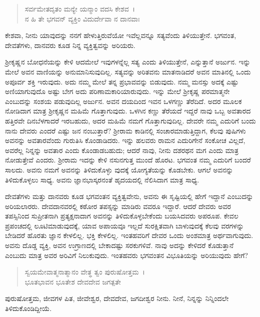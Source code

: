 \begin{verse}
ಸರ್ವಮೇತದೃತಂ ಮನ್ಯೇ ಯನ್ಮಾಂ ವದಸಿ ಕೇಶವ~।\\ನ ಹಿ ತೇ ಭಗವನ್ ವ್ಯಕ್ತಿಂ ವಿದುರ್ದೇವಾ ನ ದಾನವಾಃ 
\end{verse}

{\small ಕೇಶವಾ, ನೀನು ಯಾವುದನ್ನು ನನಗೆ ಹೇಳುತ್ತಿರುವೆಯೋ ಇವೆಲ್ಲವನ್ನೂ ಸತ್ಯವೆಂದು ತಿಳಿಯುತ್ತೇನೆ. ಭಗವಂತ, ದೇವತೆಗಳು, ದಾನವರು ಕೂಡ ನಿನ್ನ ವ್ಯಕ್ತಿತ್ವವನ್ನು ಅರಿಯರು.}

ಶ‍್ರೀಕೃಷ್ಣನ ಬೋಧನೆಯನ್ನು ಕೇಳಿ ಆದಮೇಲೆ ಇವುಗಳನ್ನೆಲ್ಲ ಸತ್ಯ ಎಂದು ತಿಳಿಯುತ್ತೇನೆ, ಎನ್ನುತ್ತಾನೆ ಅರ್ಜುನ. ಇನ್ನು ಮೇಲೆ ಅವನ ವಾಣಿಯನ್ನು ಅನುಮಾನಿಸುವುದಿಲ್ಲ. ಸತ್ಯವನ್ನು ಅರಿತವನು ಮಾತನಾಡಿದರೆ ಅವನ ಮಾತಿನಲ್ಲಿ ಒಂದು ಅಪೂರ್ವ ಶಕ್ತಿ ಇರುವುದು. ಅದು ನಮ್ಮ ಮೇಲೆ ತನ್ನ ಪ್ರಭಾವವನ್ನು ಬಿಡುವುದು. ನಮ್ಮ ಮನಸ್ಸು ಅದಕ್ಕೆ ಎಷ್ಟು ಅಣಿಯಾಗುವುದೊ ಅಷ್ಟು ಬೇಗ ಅದು ಪರಿಣಾಮಕಾರಿಯಾರುವುದು. ಇನ್ನು ಮೇಲೆ ಶ‍್ರೀಕೃಷ್ಣ ಪರಮಾತ್ಮನೇ ಎಂಬುದನ್ನು ಸಂಶಯ ಪಡುವುದಿಲ್ಲ ಅರ್ಜುನ. ಅವನ ದಯದಿಂದ ಇವನ ಒಳಗಣ್ಣು ತೆರೆದಿದೆ. ಅದರ ಮೂಲಕ ನೋಡಿದಾಗ ಮಾತ್ರ ಶ‍್ರೀಕೃಷ್ಣನ ಮಹಿಮೆ ಗೊತ್ತಾಗುವುದು. ಒಳಗಿನ ಕಣ್ಣು ತೆರೆಯದೆ ಇದ್ದರೆ ನಾವು ಒಬ್ಬ ಅವತಾರದ ಹತ್ತಿರವೇ ದಿನಬೆಳಗಾದರೆ ಇರಬಹುದು, ಅದರ ಮಹಿಮೆ ನಮಗೆ ಗೊತ್ತಾಗುವುದಿಲ್ಲ. ದೇವರೇ ನಮ್ಮ ಎದುರಿಗೆ ಬಂದು ನಾನು ದೇವರು ಎಂದರೆ ಎಷ್ಟು ಜನ ನಂಬುತ್ತಾರೆ? ಶ‍್ರೀರಾಮ ಕಾಡಿನಲ್ಲಿ ಸಂಚಾರಮಾಡುತ್ತಿದ್ದಾಗ, ಕೆಲವು ಪುಷಿಗಳು ಅವನನ್ನು ಅವತಾರವೆಂದು ಗುರುತಿಸಿ ಕೊಂಡಾಡಿದರು. ಇನ್ನು ಹಲವರು ರಾಮನ ಎದುರಿಗೇನೆ ಸಂಕೋಚ ವಿಲ್ಲದೆ, ಅವರೆಲ್ಲ ನಿನ್ನನ್ನು ಅವತಾರ ಎಂದು ಕೊಂಡಾಡಬಹುದು; ಆದರೆ ನಾವು, ನೀನು ದಶರಥನ ಮಗ ಎಂದು ಮಾತ್ರ ನೋಡುತ್ತೇವೆ ಎಂದರು. ಶ‍್ರೀರಾಮ ಇದನ್ನು ಕೇಳಿ ನಸುನಗುತ್ತ ಮುಂದೆ ಹೊರಟ. ಭಗವಂತ ನಮ್ಮ ಎದುರಿಗೆ ಬಂದರೆ ಸಾಲದು. ಅವನು ನಮಗೆ ಅವನನ್ನು ತಿಳಿದುಕೊಳ್ಳು ವುದಕ್ಕೆ ಯೋಗ್ಯತೆಯನ್ನು ಕೊಡಬೇಕು. ಆಗಲೆ ಅವನನ್ನು ತಿಳಿದುಕೊಳ್ಳಲು ಸಾಧ್ಯ. ಅವನು ಜ್ಞಾನಭಾಸ್ಕರನಂತೆ ಹೃದಯದಲ್ಲಿ ನೆಲಿಸಿದಾಗ ಮಾತ್ರ ಸಾಧ್ಯ.

ದೇವತೆಗಳು ಮತ್ತು ದಾನವರು ಕೂಡ ಭಗವಂತನ ವ್ಯಕ್ತಿತ್ವವೇನು, ಅವನು ಈ ಸೃಷ್ಟಿಯಲ್ಲಿ ಹೇಗೆ ಇದ್ದಾನೆ ಎಂಬುದನ್ನು ಅರಿಯಲಾರರು. ದೇವದಾನವರಲ್ಲಿ ಕಠೋರ ತಪಸ್ಸನ್ನು ಮಾಡಿರು ವವರೂ ಇದ್ದಾರೆ. ಆದರೆ ದೇವರು ಅವರ ತಪಸ್ಸಿನಿಂದ ಸುಪ್ರೀತನಾಗಿ ಪ್ರತ್ಯಕ್ಷನಾದಾಗ ಅವನನ್ನು ತಿಳಿದುಕೊಳ್ಳಬೇಕೆಂದು ಬಯಸಿದವರು ಅಪರೂಪ. ಕೇವಲ ಪ್ರಪಂಚದಲ್ಲಿ ಲೂಟಿಮಾಡುವುದಕ್ಕೆ, ಯಾವ ಅಪಾಯವೂ ಇಲ್ಲದೆ ಸುರಕ್ಷಿತವಾಗಿ ಬಾಳುವುದಕ್ಕೆ ಕೆಲವು ವರಗಳನ್ನು ಬೇಡಿದರೆ ಹೊರತು ಜ್ಞಾನ ಕೇಳಲಿಲ್ಲ. ಭಕ್ತಿ ಕೇಳಲಿಲ್ಲ. ಇಂತಹವರಿಗೆ ದೇವರ ಒಂದು ಅಂಶಮಾತ್ರ ಅರ್ಥವಾಗುವುದು. ಅವನು ದೊಡ್ಡ ವ್ಯಕ್ತಿ, ಅವನ ಉಗ್ರಾಣದಲ್ಲಿ ಬೇಕಾದಷ್ಟು ಸರಕುಗಳಿವೆ. ನಾವು ಅದನ್ನು ಕೇಳಿದರೆ ಕೊಡುತ್ತಾನೆ ಎಂಬುದು ಮಾತ್ರ ಅವರ ಅರಿವಿಗೆ ನಿಲುಕುವುದು. ಇಂತಹವರು ಭಗವಂತನ ವಿಭೂತಿಯನ್ನು ಅರಿಯುವುದು ಹೇಗೆ?

\begin{verse}
ಸ್ವಯಮೇವಾತ್ಮನಾತ್ಮಾನಂ ವೇತ್ಥ ತ್ವಂ ಪುರುಷೋತ್ತಮ~।\\ಭೂತಭಾವನ ಭೂತೇಶ ದೇವದೇವ ಜಗತ್ಪತೇ 
\end{verse}

{\small ಪುರುಷೋತ್ತಮ, ಜೀವಗಳ ಪಿತ, ಜೀವೇಶ್ವರ, ದೇವದೇವ, ಜಗದೀಶ್ವರ ನೀನು. ನೀನೆ, ನಿನ್ನನ್ನು ನಿನ್ನಿಂದಲೇ ತಿಳಿದುಕೊಂಡಿದ್ದೀಯೆ.}

